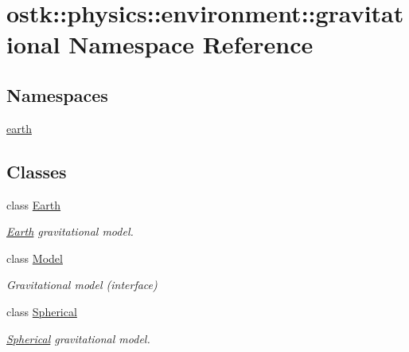 \hypertarget{namespaceostk_1_1physics_1_1environment_1_1gravitational}{}\section{ostk\+:\+:physics\+:\+:environment\+:\+:gravitational Namespace Reference}
\label{namespaceostk_1_1physics_1_1environment_1_1gravitational}
\subsection*{Namespaces}
\begin{DoxyCompactItemize}
\item 
 \hyperlink{namespaceostk_1_1physics_1_1environment_1_1gravitational_1_1earth}{earth}
\end{DoxyCompactItemize}
\subsection*{Classes}
\begin{DoxyCompactItemize}
\item 
class \hyperlink{classostk_1_1physics_1_1environment_1_1gravitational_1_1_earth}{Earth}
\begin{DoxyCompactList}\small\item\em \hyperlink{classostk_1_1physics_1_1environment_1_1gravitational_1_1_earth}{Earth} gravitational model. \end{DoxyCompactList}\item 
class \hyperlink{classostk_1_1physics_1_1environment_1_1gravitational_1_1_model}{Model}
\begin{DoxyCompactList}\small\item\em Gravitational model (interface) \end{DoxyCompactList}\item 
class \hyperlink{classostk_1_1physics_1_1environment_1_1gravitational_1_1_spherical}{Spherical}
\begin{DoxyCompactList}\small\item\em \hyperlink{classostk_1_1physics_1_1environment_1_1gravitational_1_1_spherical}{Spherical} gravitational model. \end{DoxyCompactList}\end{DoxyCompactItemize}
